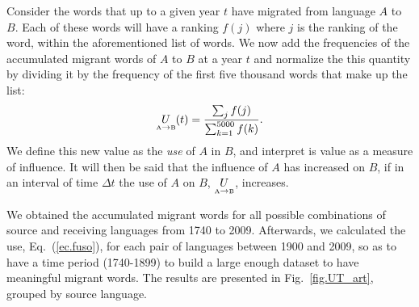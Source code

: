 \documentclass[10pt,letterpaper]{article} %
\newcommand{\eref}[1]{Eq.~(\ref{#1})}
\newcommand{\fref}[1]{Fig.~\ref{#1}}
\begin{document}
Consider the words that up to a given year $t$ have migrated from language $A$ to $B$. Each of these
words will have a ranking $f(j)$ where $j$ is the ranking of the word, within the aforementioned
list of words. 
% 
We now
add the frequencies of the accumulated
migrant words of $A$ to $B$ at a year $t$ and normalize the this quantity by
dividing it by the frequency of the first five thousand words that make up the list:
\begin{equation}
\label{ec.fuso}
\underset{ \text{\tiny A} \to  \text{\tiny B} }{U}(t) = \frac{\sum_{j}
f(j)}{\sum_{k=1}^{5000} f(k)}.
\end{equation}
We define this new value as the \textit{use} of $A$ in $B$, and interpret is value
as a measure of influence. It will then be said that the influence of $A$ has increased on
$B$, if in an interval of time $\Delta t$ the use of $A$ on $B$, $\underset{ \text{\tiny A} \to  \text{\tiny B} }{U}$, increases.

We obtained the accumulated migrant words for all possible combinations of
source and receiving languages from 1740 to 2009.  Afterwards, we calculated
the use, \eref{ec.fuso},  for each pair of languages between 1900 and 2009, so
as to have a time period (1740-1899) to build a large enough dataset to have
meaningful migrant words. The results are presented in \fref{fig.UT_art}, 
grouped by source language. 


% 



\end{document}
